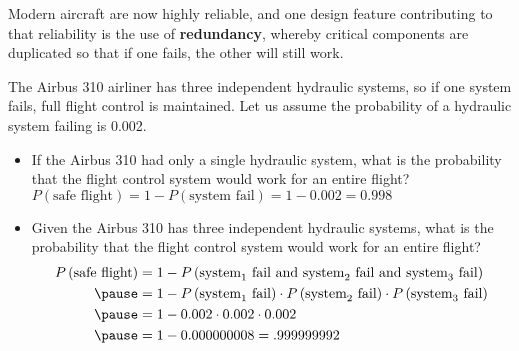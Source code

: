 \documentclass{beamer}
\newcommand{\prob}[1]{P\left(#1\right)}
\begin{document}
\begin{frame}
\begin{example}
Modern aircraft are now highly reliable, and one design feature contributing to that reliability is the use of \textbf{redundancy}, whereby critical components are duplicated so that if one fails, the other will still work.\pause

\vspace{1mm}
The Airbus 310 airliner has three independent hydraulic systems, so if one system fails, full flight control is maintained. Let us assume the probability of a hydraulic system failing is 0.002.\pause

\begin{itemize}
\item If the Airbus 310 had only a single hydraulic system, what is the probability that the flight control system would work for an entire flight?\pause \quad $\prob{\text{safe flight}}=1-\prob{\text{system fail}}=1-0.002=0.998$\pause
\item Given the Airbus 310 has three independent hydraulic systems, what is the probability that the flight control system would work for an entire flight?\pause
\vspace{-4mm}
\begin{equation*}
\begin{aligned}
\prob{\text{safe flight}}
&=1-\prob{\text{system}_1\text{ fail}\text{ and }\text{system}_2\text{ fail}\text{ and }\text{system}_3\text{ fail}}\\\pause
&=1-\prob{\text{system}_1\text{ fail}}\cdot\prob{\text{system}_2\text{ fail}}\cdot\prob{\text{system}_3\text{ fail}}\\\pause
&=1-0.002\cdot0.002\cdot0.002\\\pause
&=1-0.000000008=.999999992
\end{aligned}
\end{equation*}
\end{itemize}
\vspace{-5mm}
\end{example}
\end{frame}
\end{document}
